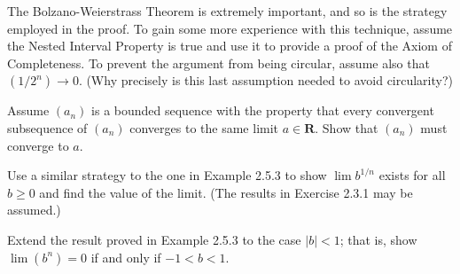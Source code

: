 \begin{solution}
\end{solution}

\begin{exercise}
  The Bolzano-Weierstrass Theorem is extremely important, and so is the strategy employed in the proof. To gain some more experience with this technique, assume the Nested Interval Property is true and use it to provide a proof of the Axiom of Completeness. To prevent the argument from being circular, assume also that $\left(1 / 2^{n}\right) \rightarrow 0$. (Why precisely is this last assumption needed to avoid circularity?)
\end{exercise}

\begin{solution}
  \TODO
\end{solution}

\begin{exercise}
  Assume $\left(a_{n}\right)$ is a bounded sequence with the property that every convergent subsequence of $\left(a_{n}\right)$ converges to the same limit $a \in \mathbf{R}$. Show that $\left(a_{n}\right)$ must converge to $a$.
\end{exercise}

\begin{solution}
  \TODO
\end{solution}

\begin{exercise}
  Use a similar strategy to the one in Example 2.5.3 to show $\lim b^{1 / n}$ exists for all $b \geq 0$ and find the value of the limit. (The results in Exercise 2.3.1 may be assumed.)
\end{exercise}

\begin{solution}
  \TODO
\end{solution}

\begin{exercise}
  Extend the result proved in Example 2.5.3 to the case $|b|<1$; that is, show $\lim \left(b^{n}\right)=0$ if and only if $-1<b<1$.
\end{exercise}

